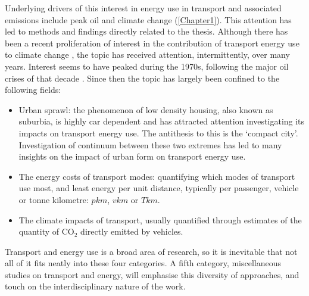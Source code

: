 Underlying drivers of this interest in energy use in transport and
associated emissions include peak oil and climate
change (\cref{Chapter1}). This attention has led to 
methods and findings directly related to the thesis.
Although there has been a recent proliferation of interest in the contribution of
transport energy use to climate change \citep{Schwanen2011}, the topic
has  received attention, intermittently, over many years. Interest seems to
have peaked during the 1970s,
following the major oil crises of that decade \citep{Greer2009}. Since then the
topic has largely been confined to the following fields:
\begin{itemize}
 \item Urban sprawl:
 the phenomenon of low density housing, also known as suburbia, is highly car
dependent and has attracted attention investigating its impacts on transport energy
use. The antithesis to this is the `compact city'. Investigation of continuum between
these two extremes has led to many insights on the impact of urban form on transport energy use.
\item The energy costs of transport modes: quantifying which modes of transport
use most, and least energy per unit distance, typically per passenger, vehicle or
tonne kilometre: $pkm$, $vkm$ or $Tkm$.
\item The climate impacts of transport, usually quantified through estimates
of the quantity of CO$_2$ directly emitted by vehicles.
\end{itemize}
Transport and energy use is a broad area of research, so it
is inevitable that not all of it fits neatly into these four categories. A fifth
category, miscellaneous studies on transport and energy, will emphasise this
diversity of approaches, and touch on the interdisciplinary nature of the work.

